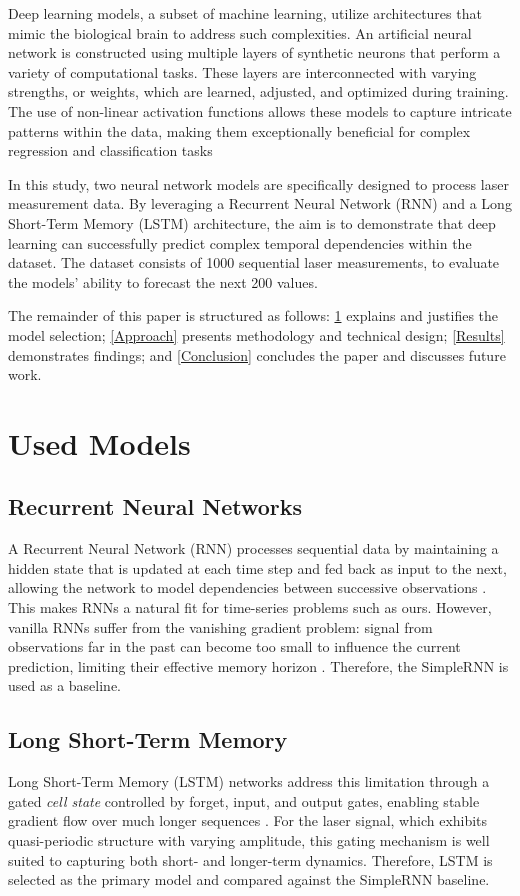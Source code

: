 \documentclass[conference]{IEEEtran}
\begin{document}
Deep learning models, a subset of machine learning, utilize architectures that mimic the biological brain to address such complexities. An artificial neural network is constructed using multiple layers of synthetic neurons that perform a variety of computational tasks. These layers are interconnected with varying strengths, or weights, which are learned, adjusted, and optimized during training. The use of non-linear activation functions allows these models to capture intricate patterns within the data, making them exceptionally beneficial for complex regression and classification tasks \cite{b2}

In this study, two neural network models are specifically designed to process laser measurement data. By leveraging a Recurrent Neural Network (RNN) and a Long Short-Term Memory (LSTM) architecture, the aim is to demonstrate that deep learning can successfully predict complex temporal dependencies within the dataset. The dataset consists of 1000 sequential laser measurements, to evaluate the models' ability to forecast the next 200 values.

The remainder of this paper is structured as follows: \cref{Models} explains and justifies the model selection; \cref{Approach} presents methodology and technical design; \cref{Results} demonstrates findings; and \cref{Conclusion} concludes the paper and discusses future work.




\section{Used Models}
\label{Models}

\subsection{Recurrent Neural Networks}
\label{RNN}
A Recurrent Neural Network (RNN) processes sequential data by maintaining a hidden state that is updated at each time step and fed back as input to the next, allowing the network to model dependencies between successive observations \cite{b3,b4}. This makes RNNs a natural fit for time-series problems such as ours. However, vanilla RNNs suffer from the vanishing gradient problem: signal from observations far in the past can become too small to influence the current prediction, limiting their effective memory horizon \cite{b5}. Therefore, the SimpleRNN is used as a baseline.

\subsection{Long Short-Term Memory}
\label{LSTM}
Long Short-Term Memory (LSTM) networks \cite{b6} address this limitation through a gated \emph{cell state} controlled by forget, input, and output gates, enabling stable gradient flow over much longer sequences \cite{b7}. For the laser signal, which exhibits quasi-periodic structure with varying amplitude, this gating mechanism is well suited to capturing both short- and longer-term dynamics. Therefore, LSTM is selected as the primary model and compared against the SimpleRNN baseline.
\end{document}

